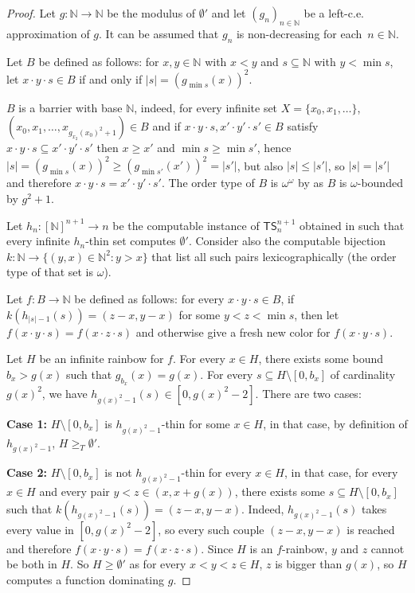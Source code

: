 \documentclass[10pt,a4paper]{article}
\newcommand{\TS}[0]{\mathsf{TS}}
\newcommand{\NN}[0]{\mathbb{N}}
\numberwithin{theorem}{section}
\begin{document}
\begin{proof}
Let $g : \NN \to \NN$ be the modulus of $\emptyset'$ and let $(g_n)_{n \in \NN}$ be a left-c.e. approximation of $g$. It can be assumed that $g_n$ is non-decreasing for each~$n \in \NN$.

Let $B$ be defined as follows: for $x,y \in \NN$ with $x < y$ and $s \subseteq \NN$ with $y < \min s$, let $x \cdot y \cdot s \in B$ if and only if $|s| = (g_{\min s}(x))^2$.

$B$ is a barrier with base $\NN$, indeed, for every infinite set $X = \{x_0,x_1, \dots\}$, $(x_0,x_1, \dots, x_{g_{x_2}(x_0)^2 + 1}) \in B$ and if $x \cdot y \cdot s, x' \cdot y' \cdot s' \in B$ satisfy $x \cdot y \cdot s \subseteq x'\cdot y' \cdot s'$ then $x \geq x'$ and $\min s \geq \min s'$, hence $|s| = (g_{\min s}(x))^2 \geq (g_{\min s'}(x'))^2 = |s'|$, but also $|s| \leq |s'|$, so $|s| = |s'|$ and therefore $x \cdot y \cdot s = x'\cdot y' \cdot s'$. The order type of $B$ is $\omega^{\omega}$ by  as $B$ is $\omega$-bounded by $g^2 + 1$.

Let $h_n : [\NN]^{n+1} \to n$ be the computable instance of $\TS^{n+1}_n$ obtained in  such that every infinite $h_n$-thin set computes $\emptyset'$. Consider also the computable bijection $k : \NN \to \{(y,x) \in \NN^2 : y > x\}$ that list all such pairs lexicographically (the order type of that set is $\omega$).

Let $f : B \to \NN$ be defined as follows: for every $x \cdot y \cdot s \in B$, if $k(h_{|s| - 1}(s)) = (z - x, y - x)$ for some $y < z < \min s$, then let $f(x \cdot y \cdot s) = f(x \cdot z \cdot s)$ and otherwise give a fresh new color for $f(x \cdot y \cdot s)$.

Let $H$ be an infinite rainbow for $f$. For every $x \in H$, there exists some bound $b_x > g(x)$ such that $g_{b_x}(x) = g(x)$. For every $s \subseteq H \setminus [0,b_x]$ of cardinality $g(x)^2$, we have $h_{g(x)^2 - 1}(s) \in [0, g(x)^2 - 2]$. There are two cases:

\textbf{Case 1:} $H \setminus [0,b_x]$ is $h_{g(x)^2 - 1}$-thin for some $x \in H$, in that case, by definition of $h_{g(x)^2 - 1}$, $H \geq_T \emptyset'$.

\textbf{Case 2:} $H \setminus [0,b_x]$ is not $h_{g(x)^2 - 1}$-thin for every $x \in H$, in that case, for every $x \in H$ and every pair $y < z \in (x, x + g(x))$, there exists some $s \subseteq H \setminus [0,b_x]$ such that $k(h_{g(x)^2 - 1}(s)) = (z - x,y - x)$. Indeed, $h_{g(x)^2 - 1}(s)$ takes every value in $[0, g(x)^2 - 2]$, so every such couple $(z - x,y - x)$ is reached and therefore $f(x \cdot y \cdot s) = f(x \cdot z \cdot s)$. Since $H$ is an $f$-rainbow, $y$ and $z$ cannot be both in $H$. So $H \geq \emptyset'$ as for every $x < y < z \in H$, $z$ is bigger than $g(x)$, so $H$ computes a function dominating $g$.

\end{proof}
\end{document}
